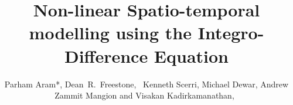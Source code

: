 \documentclass[11pt,draftcls,onecolumn,peerreview]{IEEEtran}
\begin{document}
%
\title{Non-linear Spatio-temporal modelling using the Integro-Difference Equation}
%
%
%

\author{Parham Aram*,
        Dean~R.~Freestone,~ Kenneth Scerri, Michael Dewar, Andrew Zammit Mangion and Visakan Kadirkamanathan,~}  %

% 
%



% 
 \ifCLASSOPTIONpeerreview
\else
\fi
\end{document}
